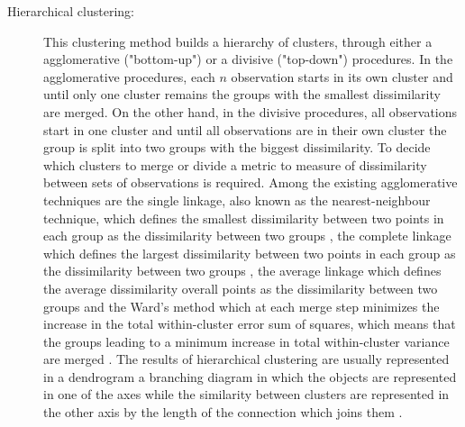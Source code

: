 \begin{description}

\item[Hierarchical clustering:] {This clustering method builds a hierarchy of clusters,
through either a agglomerative ("bottom-up") or a divisive ("top-down") procedures.
In the agglomerative procedures, each $n$ observation starts in its own cluster and until only one cluster remains the groups with the smallest dissimilarity are merged.
On the other hand, in the divisive procedures, all observations start in one cluster and until all observations are in their own cluster the group is split into two groups with the biggest dissimilarity. To decide which clusters to merge or divide a metric to measure of dissimilarity between sets of observations is required.
Among the existing agglomerative techniques are the single linkage, also known as the nearest-neighbour technique, which defines the smallest dissimilarity between two points in each group as the dissimilarity between two groups \cite{florek1951liaison}, the complete linkage which defines the largest dissimilarity between two points in each group as the dissimilarity between two groups \cite{defays1977efficient}, the average linkage which defines the average dissimilarity overall points as the dissimilarity between two groups \cite{sokal1958statistical} and the Ward’s method which at each merge step minimizes the increase in the total within-cluster error sum of
squares, which means that  the groups leading to a minimum increase in total within-cluster variance are merged \cite{ward1963hierarchical,everitt2011hierarchical}.
The results of hierarchical clustering are usually represented in a dendrogram a branching diagram in which the objects are represented in one of the axes while the similarity between clusters are represented in the other axis by the length of the connection which joins them \cite{manning1999foundations}.}


\end{description}
